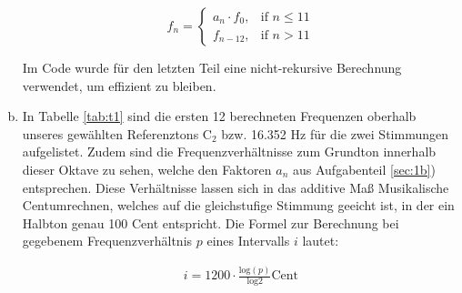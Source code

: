 \begin{enumerate}[a)]
\[
    f_n = 
\begin{cases}
    a_n \cdot f_0,& \text{if } n\leq 11 \\
    f_{n-12},&\text{if } n> 11
\end{cases}  
\]

Im Code wurde für den letzten Teil eine nicht-rekursive Berechnung verwendet, um effizient zu bleiben.

\item

In Tabelle \ref{tab:t1} sind die ersten 12 berechneten Frequenzen oberhalb unseres gewählten Referenztons C$_{2}$ bzw. 16.352 Hz für die zwei Stimmungen aufgelistet. Zudem sind die Frequenzverhältnisse zum Grundton innerhalb dieser Oktave zu sehen, welche den Faktoren $a_n$ aus Aufgabenteil \ref{sec:1b}) entsprechen. Diese Verhältnisse lassen sich in das additive Maß \glqq Musikalische Cent\grqq umrechnen, welches auf die gleichstufige Stimmung geeicht ist, in der ein Halbton genau 100 Cent entspricht. Die Formel zur Berechnung bei gegebenem Frequenzverhältnis $p$ eines Intervalls $i$ lautet:

\begin{align*}
    i = 1200 \cdot \frac{\mathrm{log}(p)}{\mathrm{log} 2} \mathrm{Cent}
\end{align*}





\end{enumerate}
